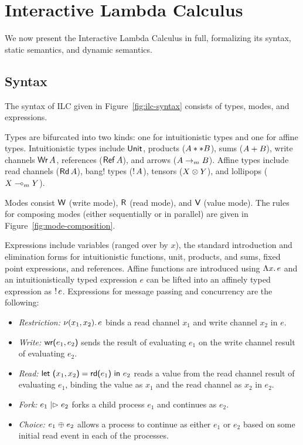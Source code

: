 \section{Interactive Lambda Calculus}
\label{sec:ilc}

We now present the Interactive Lambda Calculus in full, formalizing its syntax,
static semantics, and dynamic semantics.

\subsection{Syntax}
\label{subsec:syntax}



The syntax of ILC given in Figure~\ref{fig:ilc-syntax} consists of types, modes,
and expressions.

Types are bifurcated into two kinds: one for intuitionistic types and one for
affine types. Intuitionistic types include $\text{\textsf{Unit}}$, products
(${A} ** {B}$), sums (${A} + {B}$), write channels $\text{\textsf{Wr}}\,A$, references
($\text{\textsf{Ref}}\,A$), and arrows (${A}\rightarrow_{\footnotesize m}{B}$). Affine types
include read channels ($\text{\textsf{Rd}}\,A$), bang! types (${!}\,{A}$), tensors
(${X}\otimes{Y}$), and lollipops (${X}\multimap_{\footnotesize m}{Y}$).

Modes consist $\textsf{W}$ (write mode), $\textsf{R}$ (read mode), and $\textsf{V}$ (value mode). The
rules for composing modes (either sequentially or in parallel) are given in
Figure~\ref{fig:mode-composition}.

Expressions include variables (ranged over by $x$), the standard introduction
and elimination forms for intuitionistic functions, unit, products, and sums,
fixed point expressions, and references.  Affine functions
are introduced using $\Lambda{x}.\,{e}$ and an intuitionistically typed expression
$e$ can be lifted into an affinely typed expression as ${!}\,{e}$.   Expressions for message passing and concurrency are the
following:
\begin{itemize}[leftmargin=*]
  \item \emph{Restriction:} $\nu(x_1, x_2).\,e$ binds a read channel $x_1$ and
    write channel $x_2$ in $e$.
  \item \emph{Write:} $\text{\textsf{wr}}\textsf{(}{e_1},{e_2}\textsf{)}$ sends the result of evaluating $e_1$ on
    the write channel result of evaluating $e_2$.
  \item \emph{Read:} $\text{\textsf{let}}\ {\textsf{(}{x_1},{x_2}\textsf{)}} = {\text{\textsf{rd}}\textsf{(}{e_1}\textsf{)}}\ \text{\textsf{in}}\ {{e_2}}$ reads a value from the read
    channel result of evaluating $e_1$, binding the value as $x_1$ and the read
    channel as $x_2$ in $e_2$.
  \item \emph{Fork:} $e_1 \mathrel{|\rhd} e_2$ forks a child process $e_1$ and
    continues as $e_2$.
  \item \emph{Choice:} $e_1 \mathrel{\oplus} e_2$ allows a process to continue as
    either $e_1$ or $e_2$ based on some initial read event in each of the
    processes.
\end{itemize}

